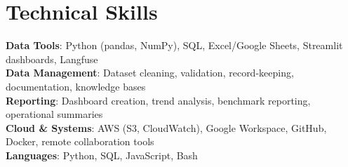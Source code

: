 \documentclass[letterpaper,11pt]{article}
\begin{document}
\section{Technical Skills}
 \begin{itemize}[leftmargin=0.15in, label={}]
    \small{\item{
     \textbf{Data Tools}{: Python (pandas, NumPy), SQL, Excel/Google Sheets, Streamlit dashboards, Langfuse} \\
     \textbf{Data Management}{: Dataset cleaning, validation, record-keeping, documentation, knowledge bases} \\
     \textbf{Reporting}{: Dashboard creation, trend analysis, benchmark reporting, operational summaries} \\
     \textbf{Cloud \& Systems}{: AWS (S3, CloudWatch), Google Workspace, GitHub, Docker, remote collaboration tools} \\
     \textbf{Languages}{: Python, SQL, JavaScript, Bash}
    }}
 \end{itemize}


\end{document}
